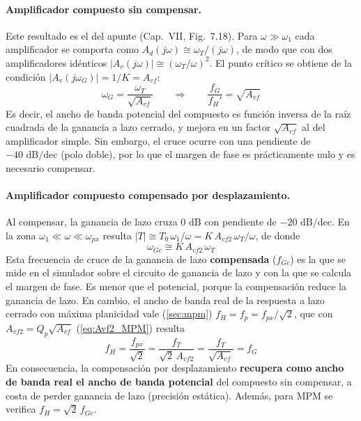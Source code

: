 \paragraph{Amplificador compuesto sin compensar.} Este resultado es el del apunte (Cap.~VII, Fig.~7.18). Para $\omega \gg \omega_1$ cada amplificador se comporta como $A_d(j\omega) \cong \omega_T/(j\omega)$, de modo que con dos amplificadores idénticos $|A_v(j\omega)| \cong (\omega_T/\omega)^2$. El punto crítico se obtiene de la condición $|A_v(j\omega_G)| = 1/K = A_{vf}$:
\begin{equation}
    \omega_G = \frac{\omega_T}{\sqrt{A_{vf}}} \qquad\Rightarrow\qquad \frac{f_G}{f_H'} = \sqrt{A_{vf}}
    \label{eq:wG}
\end{equation}
Es decir, el ancho de banda potencial del compuesto es función inversa de la raíz cuadrada de la ganancia a lazo cerrado, y mejora en un factor $\sqrt{A_{vf}}$ al del amplificador simple. Sin embargo, el cruce ocurre con una pendiente de $-40\text{ dB/dec}$ (polo doble), por lo que el margen de fase es prácticamente nulo y es necesario compensar.

\paragraph{Amplificador compuesto compensado por desplazamiento.} Al compensar, la ganancia de lazo cruza $0\text{ dB}$ con pendiente de $-20\text{ dB/dec}$. En la zona $\omega_1 \ll \omega \ll \omega_{px}$ resulta $|T| \cong T_0\,\omega_1/\omega = K\,A_{vf2}\,\omega_T/\omega$, de donde
\begin{equation}
    \omega_{Gc} \cong K\, A_{vf2}\,\omega_T
    \label{eq:wGc}
\end{equation}
Esta frecuencia de cruce de la ganancia de lazo \textbf{compensada} ($f_{Gc}$) es la que se mide en el simulador sobre el circuito de ganancia de lazo y con la que se calcula el margen de fase. Es menor que el potencial, porque la compensación reduce la ganancia de lazo. En cambio, el ancho de banda real de la respuesta a lazo cerrado con máxima planicidad vale (\autoref{sec:mpm}) $f_H = f_p = f_{px}/\sqrt{2}$, que con $A_{vf2} = Q_p\sqrt{A_{vf}}$ (\autoref{eq:Avf2_MPM}) resulta
\begin{equation}
    f_H = \frac{f_{px}}{\sqrt{2}} = \frac{f_T}{\sqrt{2}\,A_{vf2}} = \frac{f_T}{\sqrt{A_{vf}}} = f_G
    \label{eq:wH_MPM}
\end{equation}
En consecuencia, la compensación por desplazamiento \textbf{recupera como ancho de banda real el ancho de banda potencial} del compuesto sin compensar, a costa de perder ganancia de lazo (precisión estática). Además, para MPM se verifica $f_H = \sqrt{2}\,f_{Gc}$.

